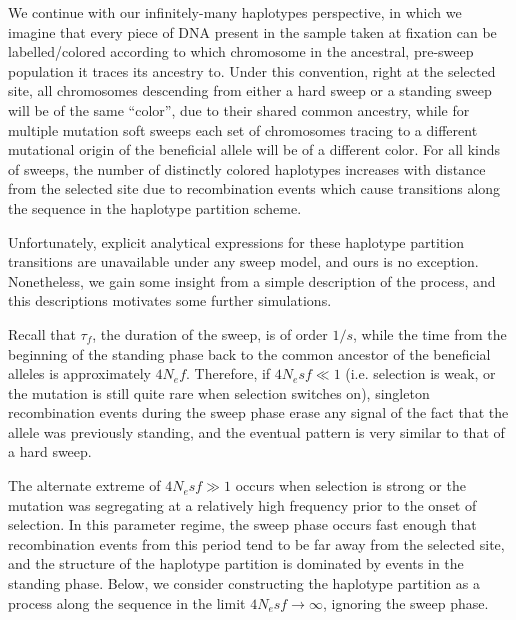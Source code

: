 \documentclass[a4paper,10pt]{article}
\begin{document}
We continue with our infinitely-many haplotypes perspective, in which we imagine that every piece of DNA present in the sample taken at fixation can be labelled/colored according to which chromosome in the ancestral, pre-sweep population it traces its ancestry to. Under this convention, right at the selected site, all chromosomes descending from either a hard sweep or a standing sweep will be of the same ``color'', due to their shared common ancestry, while for multiple mutation soft sweeps each set of chromosomes tracing to a different mutational origin of the beneficial allele will be of a different color. For all kinds of sweeps, the number of distinctly colored haplotypes increases with distance from the selected site due to recombination events which cause transitions along the sequence in the haplotype partition scheme.

Unfortunately, explicit analytical expressions for these haplotype partition transitions are unavailable under any sweep model, and ours is no exception. Nonetheless, we gain some insight from a simple description of the process, and this descriptions motivates some further simulations.

Recall that $\tau_{f}$, the duration of the sweep, is of order $1/s$, while the time from the beginning of the standing phase back to the common ancestor of the beneficial alleles is approximately $4N_e f$. Therefore, if $4N_e s f \ll 1$ (i.e. selection is weak, or the mutation is still quite rare when selection switches on), singleton recombination events during the sweep phase erase any signal of the fact that the allele was previously standing, and the eventual pattern is very similar to that of a hard sweep.

The alternate extreme of $4N_e s f \gg 1$ occurs when selection is strong or the mutation was segregating at a relatively high frequency prior to the onset of selection. In this parameter regime, the sweep phase occurs fast enough that recombination events from this period tend to be far away from the selected site, and the structure of the haplotype partition is dominated by events in the standing phase. Below, we consider constructing the haplotype partition as a process along the sequence in the limit $4N_e s f \rightarrow \infty$, ignoring the sweep phase.
\end{document}
